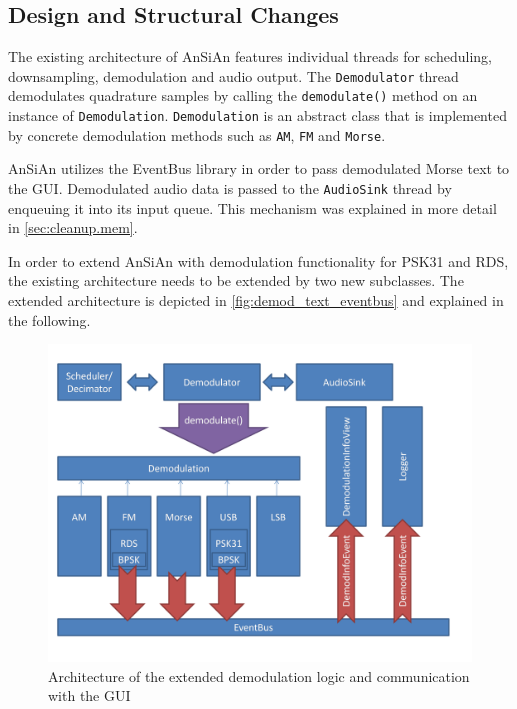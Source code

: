 \subsection{Design and Structural Changes\label{sec:demod_design}}

The existing architecture of \ac{AnSiAn} features individual threads for scheduling, 
downsampling, demodulation and audio output. The \texttt{De\-mo\-du\-la\-tor} thread demodulates 
quadrature samples by calling the \texttt{demodulate()} method on an instance of
\texttt{Demodulation}. \texttt{Demodulation} is an abstract class that is implemented by concrete 
demodulation methods such as \texttt{AM}, \texttt{FM} and \texttt{Morse}. 

\ac{AnSiAn} utilizes the EventBus library in order to pass demodulated Morse text
to the \ac{GUI}. Demodulated audio data is passed to the
\texttt{AudioSink} thread by enqueuing it into its input queue.
This mechanism was explained in more detail in \autoref{sec:cleanup.mem}.


In order to extend \ac{AnSiAn} with demodulation functionality for \ac{PSK31} and \ac{RDS}, 
the existing architecture needs to be extended by two new subclasses. The extended architecture is
depicted in \autoref{fig:demod_text_eventbus} and explained in the following.

\begin{figure}
	\centering
	\includegraphics[width=1\linewidth]{gfx/demod_text_eventbus.png}
	\caption{Architecture of the extended demodulation logic and communication with the GUI}
	\label{fig:demod_text_eventbus}
\end{figure}

